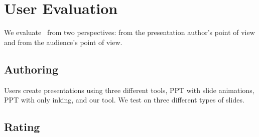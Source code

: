 \section{User Evaluation}

We evaluate \interface\ from two perspectives: from the presentation author's point of view and from the audience's point of view. 

\subsection{Authoring}

Users create presentations using three different tools, PPT with slide animations, PPT with only inking, and our tool. We test on three different types of slides. 

\subsection{Rating}
